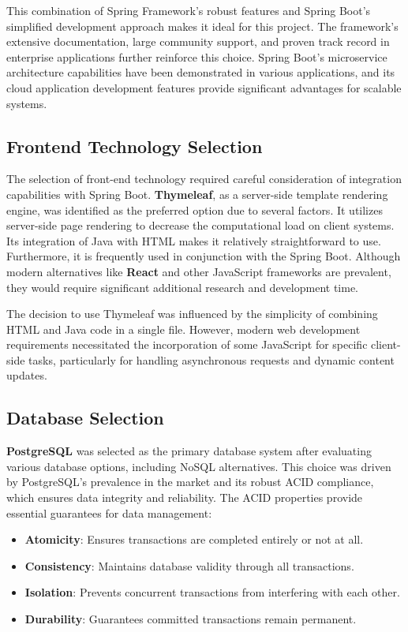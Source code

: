 This combination of Spring Framework's robust features and Spring Boot's simplified development approach makes it ideal for this project.
The framework's extensive documentation, large community support, and proven track record in enterprise applications further reinforce this choice.
Spring Boot's microservice architecture capabilities have been demonstrated in various applications\cite{Suryotrisongko2017}, and its cloud application development features provide significant advantages for scalable systems\cite{Kozak2023}.

\subsection{Frontend Technology Selection}\label{subsec:frontend-selection}

The selection of front-end technology required careful consideration of integration capabilities with Spring Boot.
\textbf{Thymeleaf}, as a server-side template rendering engine, was identified as the preferred option due to several factors.
It utilizes server-side page rendering to decrease the computational load on client systems.
Its integration of Java with HTML makes it relatively straightforward to use.
Furthermore, it is frequently used in conjunction with the Spring Boot.
Although modern alternatives like \textbf{React} and other JavaScript frameworks are prevalent, they would require significant additional research and development time.

The decision to use Thymeleaf was influenced by the simplicity of combining HTML and Java code in a single file.
However, modern web development requirements necessitated the incorporation of some JavaScript for specific client-side tasks, particularly for handling asynchronous requests and dynamic content updates.

\subsection{Database Selection}\label{subsec:database-selection}

\textbf{PostgreSQL} was selected as the primary database system after evaluating various database options, including NoSQL alternatives.
This choice was driven by PostgreSQL's prevalence in the market and its robust ACID compliance, which ensures data integrity and reliability.
The ACID properties provide essential guarantees for data management:

\begin{itemize}
    \item \textbf{Atomicity}: Ensures transactions are completed entirely or not at all.
    \item \textbf{Consistency}: Maintains database validity through all transactions.
    \item \textbf{Isolation}: Prevents concurrent transactions from interfering with each other.
    \item \textbf{Durability}: Guarantees committed transactions remain permanent.
\end{itemize}

